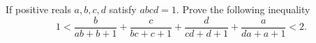 If positive reals $a,b,c,d$ satisfy $abcd = 1.$ Prove the following inequality $$1<\frac{b}{ab+b+1}+\frac{c}{bc+c+1}+\frac{d}{cd+d+1}+\frac{a}{da+a+1}<2.$$